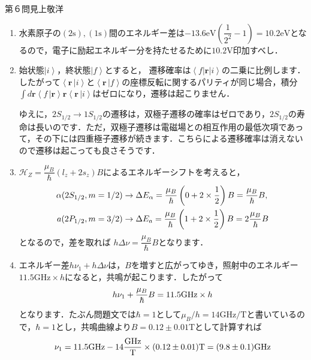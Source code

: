 \newcommand{\ket}[1]{\left| {#1} \right\rangle}
\newcommand{\bra}[1]{\left\langle {#1} \right|}
\newcommand{\bracket}[2]{\left\langle {#1} \,\right|\left. {#2} \right\rangle}
\begin{answer}{第６問}{見上敬洋}
\begin{enumerate}
\item
  水素原子の$\mathrm{(2s)},\mathrm{(1s)}$間のエネルギー差は$-13.6\mathrm{eV}\left( \dfrac 1{2^2} - 1 \right) = 10.2 \mathrm{eV}$となるので，電子に励起エネルギー分を持たせるために$10.2\mathrm{V}$印加すべし．

\item
  始状態$\ket{i}$，終状態$\ket f$とすると， 遷移確率は$\bra f \bm{r} \ket i$の二乗に比例します．したがって$\bracket{\bm{r}}{i}$と$\bracket {\bm{r}}{f}$の座標反転に関するパリティが同じ場合，積分$\int d\bm{r} \bracket{f}{\bm{r}}\bm{r}\bracket{\bm{r}}{i}$はゼロになり，遷移は起こりません．

  ゆえに，$2S_{1/2} \to 1S_{1/2}$の遷移は，双極子遷移の確率はゼロであり，$2S_{1/2}$の寿命は長いのです．ただ，双極子遷移は電磁場との相互作用の最低次項であって，その下には四重極子遷移が続きます．こちらによる遷移確率は消えないので遷移は起こっても良さそうです．

\item
  $\mathcal{H}_Z = \dfrac{\mu_B}{\hbar}(l_z + 2s_z)B$によるエネルギーシフトを考えると，
  \begin{align}
  \alpha(2S_{1/2},m=1/2) &\to \Delta E_\alpha = \frac{\mu_B}{\hbar}\left(0 + 2 \times \frac 12 \right)B = \frac{\mu_B}{\hbar} B \notag, \\
  a(2P_{1/2},m=3/2) &\to \Delta E_a = \frac{\mu_B}{\hbar}\left(1 + 2\times \frac 12 \right) B = 2\frac{\mu_B}{\hbar} B \notag
  \end{align}
  となるので，差を取れば $h \Delta \nu = \dfrac{\mu_B}{\hbar}B$となります．

\item
  エネルギー差$h\nu_1 + h\Delta \nu$は，$B$を増すと広がってゆき，照射中のエネルギー$11.5\mathrm{GHz}\times h$になると，共鳴が起こります．したがって
  \begin{equation}
  h\nu_1 + \frac{\mu_B}{\hbar}B = 11.5 \mathrm{GHz}\times h \notag
  \end{equation}
  となります．たぶん問題文では$\hbar = 1$として$\mu_B/h = 14 \mathrm{GHz/T}$と書いているので，$\hbar = 1$とし，共鳴曲線より$B = 0.12\pm 0.01 \mathrm{T}$として計算すれば
  \begin{equation}
  \nu_1 = 11.5\mathrm{GHz} - 14\mathrm{\frac{GHz}{T}}\times(0.12 \pm 0.01)\mathrm{T} = (9.8\pm 0.1)\mathrm{GHz} \notag
  \end{equation}


\end{enumerate}
\end{answer}
